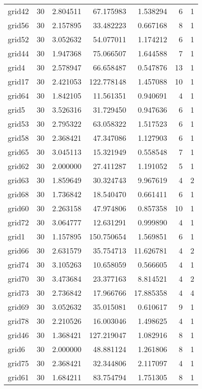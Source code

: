\begin{longtable}{|l|r|r|r|r|r|r|}
grid42 & 30 & 2.804511 & 67.175983 & 1.538294 & 6 & 1 \\
grid56 & 30 & 2.157895 & 33.482223 & 0.667168 & 8 & 1 \\
grid52 & 30 & 3.052632 & 54.077011 & 1.174212 & 6 & 1 \\
grid44 & 30 & 1.947368 & 75.066507 & 1.644588 & 7 & 1 \\
grid4 & 30 & 2.578947 & 66.658487 & 0.547876 & 13 & 1 \\
grid17 & 30 & 2.421053 & 122.778148 & 1.457088 & 10 & 1 \\
grid64 & 30 & 1.842105 & 11.561351 & 0.940691 & 4 & 1 \\
grid5 & 30 & 3.526316 & 31.729450 & 0.947636 & 6 & 1 \\
grid53 & 30 & 2.795322 & 63.058322 & 1.517523 & 6 & 1 \\
grid58 & 30 & 2.368421 & 47.347086 & 1.127903 & 6 & 1 \\
grid65 & 30 & 3.045113 & 15.321949 & 0.558548 & 7 & 1 \\
grid62 & 30 & 2.000000 & 27.411287 & 1.191052 & 5 & 1 \\
grid63 & 30 & 1.859649 & 30.324743 & 9.967619 & 4 & 2 \\
grid68 & 30 & 1.736842 & 18.540470 & 0.661411 & 6 & 1 \\
grid60 & 30 & 2.263158 & 47.974806 & 0.857358 & 10 & 1 \\
grid72 & 30 & 3.064777 & 12.631291 & 0.999890 & 4 & 1 \\
grid1 & 30 & 1.157895 & 150.750654 & 1.569851 & 6 & 1 \\
grid66 & 30 & 2.631579 & 35.754713 & 11.626781 & 4 & 2 \\
grid74 & 30 & 3.105263 & 10.658059 & 0.566605 & 4 & 1 \\
grid70 & 30 & 3.473684 & 23.377163 & 8.814521 & 4 & 2 \\
grid73 & 30 & 2.736842 & 17.966766 & 17.885358 & 4 & 4 \\
grid69 & 30 & 3.052632 & 35.015081 & 0.610617 & 9 & 1 \\
grid78 & 30 & 2.210526 & 16.003046 & 1.498625 & 4 & 1 \\
grid46 & 30 & 1.368421 & 127.219047 & 1.082916 & 8 & 1 \\
grid6 & 30 & 2.000000 & 48.881124 & 1.261806 & 8 & 1 \\
grid75 & 30 & 2.368421 & 32.344806 & 2.117097 & 4 & 1 \\
grid61 & 30 & 1.684211 & 83.754794 & 1.751305 & 8 & 1 \\

\end{longtable}
